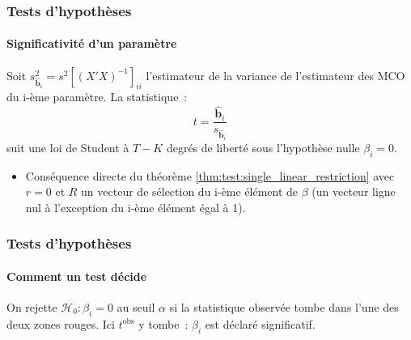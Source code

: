 \documentclass[10pt]{beamer}
\begin{document}
\begin{frame}
  \frametitle{Tests d'hypothèses}
  \framesubtitle{Significativité d'un paramètre}

  \begin{cor}\label{cor:student_statistic}
    Soit $s_{\hat{\mathbf b}_i}^2 = s^2 \left[ (X'X)^{-1} \right]_{ii}$ l'estimateur de la variance de l'estimateur des MCO du i-ème paramètre. La statistique~:
    \[
      t = \frac{\hat{\mathbf b}_i}{s_{\hat{\mathbf b}_i}}
    \]
    suit une loi de Student à $T-K$ degrés de liberté sous l'hypothèse nulle $\beta_i = 0$.
  \end{cor}

  \bigskip

  \begin{itemize}

  \item Conséquence directe du théorème
    \ref{thm:test:single_linear_restriction} avec $r = 0$ et $R$ un
    vecteur de sélection du i-ème élément de $\beta$ (un vecteur ligne
    nul à l'exception du i-ème élément égal à 1).\newline

  \end{itemize}

\end{frame}


\begin{frame}[c]
  \frametitle{Tests d'hypothèses}
  \framesubtitle{Comment un test décide}

  \begin{center}
    \scalebox{.78}{}
  \end{center}

  \medskip

  {\small On rejette $\mathcal H_0:\beta_i=0$ au seuil $\alpha$ si la statistique
    observée tombe dans l'une des deux zones rouges. Ici $t^{\text{obs}}$ y tombe~:
    $\beta_i$ est déclaré significatif.}

\end{frame}
\end{document}
